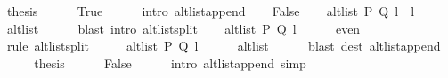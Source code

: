 \begin{isabellebody}
\ {\isacharquery}{\kern0pt}thesis\isanewline
\ \ \ \ \isamarkupfalse%
\ True\isanewline
\ \ \ \ \isamarkupfalse%
\ {\isacharparenleft}{\kern0pt}intro\ alt{\isacharunderscore}{\kern0pt}list{\isacharunderscore}{\kern0pt}append{\isacharunderscore}{\kern0pt}{}{\isacharparenright}{\kern0pt}\isanewline
{}\isamarkupfalse%
\isanewline
\ \ \isamarkupfalse%
\ False\isanewline
\ \ \isamarkupfalse%
\ {\isachardoublequoteopen}alt{\isacharunderscore}{\kern0pt}list\ P\ Q\ {\isacharparenleft}{\kern0pt}l{}\ {\isacharat}{\kern0pt}\ l{}{\isacharparenright}{\kern0pt}{\isachardoublequoteclose}\isanewline
\ \ \ \ \isamarkupfalse%
\ alt{\isacharunderscore}{\kern0pt}list\isanewline
\ \ \ \ \isamarkupfalse%
\ {\isacharparenleft}{\kern0pt}blast\ intro{\isacharcolon}{\kern0pt}\ alt{\isacharunderscore}{\kern0pt}list{\isacharunderscore}{\kern0pt}split{\isacharunderscore}{\kern0pt}{}{\isacharparenright}{\kern0pt}\isanewline
\ \ \isamarkupfalse%
\ {\isachardoublequoteopen}alt{\isacharunderscore}{\kern0pt}list\ P\ Q\ l{}{\isachardoublequoteclose}\isanewline
\ \ \ \ \isamarkupfalse%
\ even\isanewline
\ \ \ \ \isamarkupfalse%
\ {\isacharparenleft}{\kern0pt}rule\ alt{\isacharunderscore}{\kern0pt}list{\isacharunderscore}{\kern0pt}split{\isacharunderscore}{\kern0pt}{}{\isacharparenright}{\kern0pt}\isanewline
\ \ \isamarkupfalse%
\ \isamarkupfalse%
\ {\isachardoublequoteopen}alt{\isacharunderscore}{\kern0pt}list\ P\ Q\ l{}{\isachardoublequoteclose}\isanewline
\ \ \ \ \isamarkupfalse%
\ alt{\isacharunderscore}{\kern0pt}list\isanewline
\ \ \ \ \isamarkupfalse%
\ {\isacharparenleft}{\kern0pt}blast\ dest{\isacharcolon}{\kern0pt}\ alt{\isacharunderscore}{\kern0pt}list{\isacharunderscore}{\kern0pt}append{\isacharunderscore}{\kern0pt}{}{\isacharparenright}{\kern0pt}\isanewline
\ \ \isamarkupfalse%
\ \isamarkupfalse%
\ {\isacharquery}{\kern0pt}thesis\isanewline
\ \ \ \ \isamarkupfalse%
\ False\isanewline
\ \ \ \ \isamarkupfalse%
\ {\isacharparenleft}{\kern0pt}intro\ alt{\isacharunderscore}{\kern0pt}list{\isacharunderscore}{\kern0pt}append{\isacharunderscore}{\kern0pt}{}{\isacharparenright}{\kern0pt}\ simp{\isacharplus}{\kern0pt}\isanewline
{}\isamarkupfalse%
%
\endisatagproof

\end{isabellebody}
